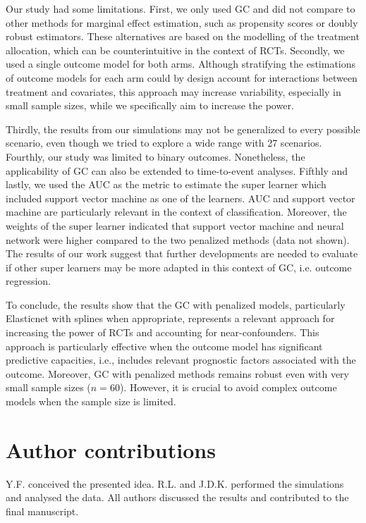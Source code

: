 \documentclass{article}
\begin{document}
Our study had some limitations. First, we only used GC and did not compare to other methods for marginal effect estimation, such as propensity scores or doubly robust estimators. These alternatives are based on the modelling of the treatment allocation, which can be counterintuitive in the context of RCTs. 
Secondly, we used a single outcome model for both arms. Although stratifying the estimations of outcome models for each arm could by design account for interactions between treatment and covariates,\cite{kunzel_metalearners_2019} this approach may increase variability, especially in small sample sizes, while we specifically aim to increase the power.

Thirdly, the results from our simulations may not be generalized to every possible scenario, even though we tried to explore a wide range with 27 scenarios. Fourthly, our study was limited to binary outcomes. Nonetheless, the applicability of GC can also be extended to time-to-event analyses. \cite{chatton_g-computation_2022}
Fifthly and lastly, we used the AUC as the metric to estimate the super learner which included support vector machine as one of the learners. AUC and support vector machine are particularly relevant in the context of classification. Moreover, the weights of the super learner indicated that support vector machine and neural network were higher compared to the two penalized methods (data not shown). The results of our work suggest that further developments are needed to evaluate if other super learners may be more adapted in this context of GC, i.e. outcome regression.



To conclude, the results show that the GC with penalized models, particularly Elasticnet with splines when appropriate, represents a relevant approach for increasing the power of RCTs and accounting for  near-confounders. This approach is particularly effective when the outcome model has significant predictive capacities, i.e., includes relevant prognostic factors associated with the outcome. 
Moreover, GC with penalized methods remains robust even with very small sample sizes ($n=60$). 
However, it is crucial to avoid complex outcome models when the sample size is limited.



\section*{Author contributions}
Y.F.  conceived the presented idea.  R.L.  and J.D.K. performed the simulations and analysed the data.  All authors discussed the results and contributed to the final manuscript.
\end{document}
